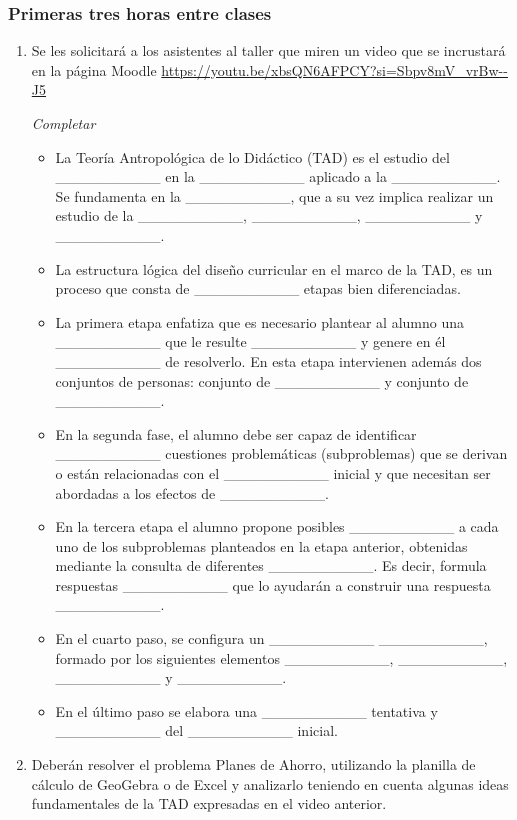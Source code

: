 \subsubsection{Primeras tres horas entre clases}

\begin{enumerate}
	\item Se les solicitará a los asistentes al taller que miren un video que se incrustará en la página Moodle \url{https://youtu.be/xbsQN6AFPCY?si=Sbpv8mV\_vrBw--J5}
	
	\bigskip
	\begin{minipage}{0.9\linewidth}
		\textit{Completar}
		
		\begin{itemize}
			\item La Teoría Antropológica de lo Didáctico (TAD) es el estudio del \_\_\_\_\_\_\_\_\_\_ en la \_\_\_\_\_\_\_\_\_\_ aplicado a la \_\_\_\_\_\_\_\_\_\_. Se fundamenta en la \_\_\_\_\_\_\_\_\_\_, que a su vez implica realizar un estudio de la \_\_\_\_\_\_\_\_\_\_, \_\_\_\_\_\_\_\_\_\_, \_\_\_\_\_\_\_\_\_\_ y \_\_\_\_\_\_\_\_\_\_.
			\item La estructura lógica del diseño curricular en el marco de la TAD, es un proceso
			que consta de \_\_\_\_\_\_\_\_\_\_ etapas bien diferenciadas.
			\item La primera etapa enfatiza que es necesario plantear al alumno una \_\_\_\_\_\_\_\_\_\_ que le resulte \_\_\_\_\_\_\_\_\_\_ y genere en él \_\_\_\_\_\_\_\_\_\_ de resolverlo. En esta etapa intervienen además dos conjuntos de personas: conjunto de \_\_\_\_\_\_\_\_\_\_ y conjunto de \_\_\_\_\_\_\_\_\_\_.
			\item En la segunda fase, el alumno debe ser capaz de identificar \_\_\_\_\_\_\_\_\_\_ cuestiones problemáticas (subproblemas) que se derivan o están relacionadas con el \_\_\_\_\_\_\_\_\_\_ inicial y que necesitan ser abordadas a los efectos de \_\_\_\_\_\_\_\_\_\_.
			\item En la tercera etapa el alumno propone posibles \_\_\_\_\_\_\_\_\_\_ a cada uno de los subproblemas planteados en la etapa anterior, obtenidas mediante la consulta de diferentes \_\_\_\_\_\_\_\_\_\_. Es decir, formula respuestas \_\_\_\_\_\_\_\_\_\_ que lo ayudarán a construir una respuesta \_\_\_\_\_\_\_\_\_\_.
			\item En el cuarto paso, se configura un \_\_\_\_\_\_\_\_\_\_ \_\_\_\_\_\_\_\_\_\_, formado por los siguientes elementos \_\_\_\_\_\_\_\_\_\_, \_\_\_\_\_\_\_\_\_\_, \_\_\_\_\_\_\_\_\_\_ y \_\_\_\_\_\_\_\_\_\_.
			\item En el último paso se elabora una \_\_\_\_\_\_\_\_\_\_ tentativa y \_\_\_\_\_\_\_\_\_\_ del \_\_\_\_\_\_\_\_\_\_ inicial.
		\end{itemize}
	\end{minipage}
	\bigskip
	
	\item  Deberán resolver el problema Planes de Ahorro, utilizando la planilla de cálculo de GeoGebra o de Excel y analizarlo teniendo en cuenta algunas ideas fundamentales de la TAD expresadas en el video anterior.
\end{enumerate}

